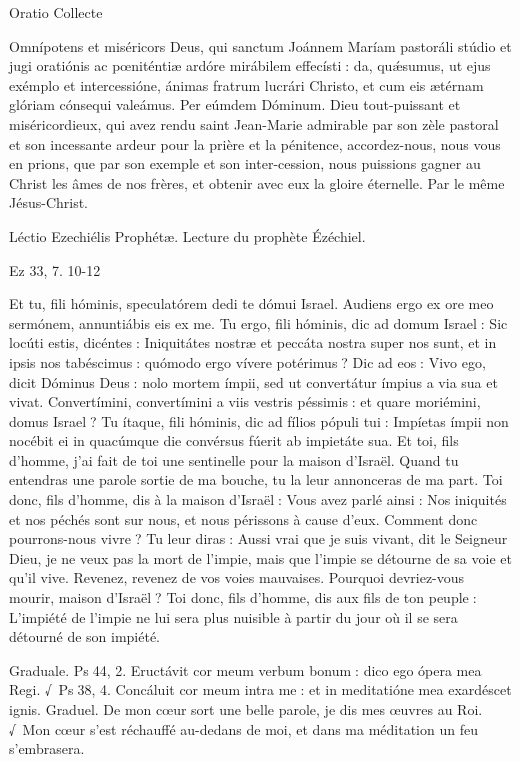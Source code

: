 \begin{paracol}{2}
Oratio
\switchcolumn
Collecte
\switchcolumn*

Omnípotens et miséricors Deus,  qui sanctum Joánnem Maríam pastoráli stúdio et jugi oratiónis ac pœniténtiæ ardóre mirábilem effecísti : da, quǽsumus, ut ejus exémplo et intercessióne, ánimas fratrum lucrári Christo, et cum eis ætérnam glóriam cónsequi valeámus. Per eúmdem Dóminum.
\switchcolumn
Dieu tout-puissant et miséricordieux,  qui avez rendu saint Jean-Marie admirable par son zèle pastoral et son incessante ardeur pour la prière et la pénitence, accordez-nous, nous vous en prions, que par son exemple et son inter-cession, nous puissions gagner au Christ les âmes de nos frères, et obtenir avec eux la gloire éternelle. Par le même Jésus-Christ.
\switchcolumn*

Léctio Ezechiélis Prophétæ.
\switchcolumn
Lecture du prophète Ézéchiel.
\switchcolumn*

Ez 33, 7. 10-12
\switchcolumn

\switchcolumn*

Et tu, fili hóminis, speculatórem  dedi te dómui Israel. Audiens ergo ex ore meo sermónem, annuntiábis eis ex me. Tu ergo, fili hóminis, dic ad domum Israel : Sic locúti estis, dicéntes : Iniquitátes nostræ et peccáta nostra super nos sunt, et in ipsis nos tabéscimus : quómodo ergo vívere potérimus ? Dic ad eos : Vivo ego, dicit Dóminus Deus : nolo mortem ímpii, sed ut convertátur ímpius a via sua et vivat. Convertímini, convertímini a viis vestris péssimis : et quare moriémini, domus Israel ? Tu ítaque, fili hóminis, dic ad fílios pópuli tui : Impíetas ímpii non nocébit ei in quacúmque die convérsus fúerit ab impietáte sua.
\switchcolumn
Et toi, fils d’homme, j’ai fait de toi une  sentinelle pour la maison d’Israël. Quand tu entendras une parole sortie de ma bouche, tu la leur annonceras de ma part. Toi donc, fils d’homme, dis à la maison d’Israël : Vous avez parlé ainsi : Nos iniquités et nos péchés sont sur nous, et nous périssons à cause d’eux. Comment donc pourrons-nous vivre ? Tu leur diras : Aussi vrai que je suis vivant, dit le Seigneur Dieu, je ne veux pas la mort de l’impie, mais que l’impie se détourne de sa voie et qu’il vive. Revenez, revenez de vos voies mauvaises. Pourquoi devriez-vous mourir, maison d’Israël ? Toi donc, fils d’homme, dis aux fils de ton peuple : L’impiété de l’impie ne lui sera plus nuisible à partir du jour où il se sera détourné de son impiété.
\switchcolumn*

Graduale. Ps 44, 2. Eructávit cor meum verbum bonum : dico ego ópera mea Regi. √~Ps 38, 4. Concáluit cor meum intra me : et in meditatióne mea exardéscet ignis.
\switchcolumn
Graduel. De mon cœur sort une belle parole, je dis mes œuvres au Roi. √~Mon cœur s’est réchauffé au-dedans de moi, et dans ma méditation un feu s’embrasera.
\switchcolumn*


\end{paracol}
